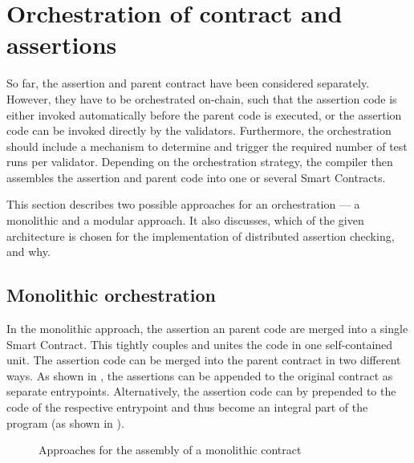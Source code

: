 \section{Orchestration of contract and assertions}\label{sec:orchestration}
So far, the assertion and parent contract have been considered separately. However, they have to be orchestrated on-chain, such that the assertion code is either invoked automatically before the parent code is executed, or the assertion code can be invoked directly by the validators. Furthermore, the orchestration should include a mechanism to determine and trigger the required number of test runs per validator. Depending on the orchestration strategy, the compiler then assembles the assertion and parent code into one or several Smart Contracts.

This section describes two possible approaches for an orchestration --- a monolithic and a modular approach. It also discusses, which of the given architecture is chosen for the implementation of distributed assertion checking, and why.

\subsection{Monolithic orchestration}
In the monolithic approach, the assertion an parent code are merged into a single Smart Contract. This tightly couples and unites the code in one self-contained unit. The assertion code can be merged into the parent contract in two different ways. As shown in , the assertions can be appended to the original contract as separate entrypoints. Alternatively, the assertion code can by prepended to the code of the respective entrypoint and thus become an integral part of the program (as shown in ).
\begin{figure}[!htb]
\quad
{}
\caption{Approaches for the assembly of a monolithic contract}
\label{fig:monolithic_orchestration_basic}
\end{figure}

